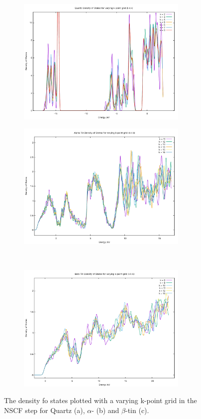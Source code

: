 \documentclass[12pt]{article}
\begin{document}
\begin{figure}[h!!!!!]
	\centering
	\begin{subfigure}[t]{0.5\textwidth}
		\includegraphics[width=8.2cm]{quartz-dos-data/quartz-k-vary-dos.pdf}
		\label{fig:quartz-k-dos}
	\end{subfigure}%
	\begin{subfigure}[t]{0.5\textwidth}
		\includegraphics[width=8.2cm]{alpha-dos-data/alpha-k-vary-dos.pdf}
		\label{fig:alpha-k-dos}
	\end{subfigure}%
	\\
	\begin{subfigure}[t]{0.5\textwidth}
		\includegraphics[width=8.2cm]{beta-dos-data/beta-k-vary-dos.pdf}
		\label{fig:beta-k-dos}
	\end{subfigure}
	\caption{The density fo states plotted with a varying k-point grid in the NSCF step for Quartz (a), $\alpha$- (b) and $\beta$-tin (c).}
	\label{fig:k-vary}
\end{figure}
\end{document}
